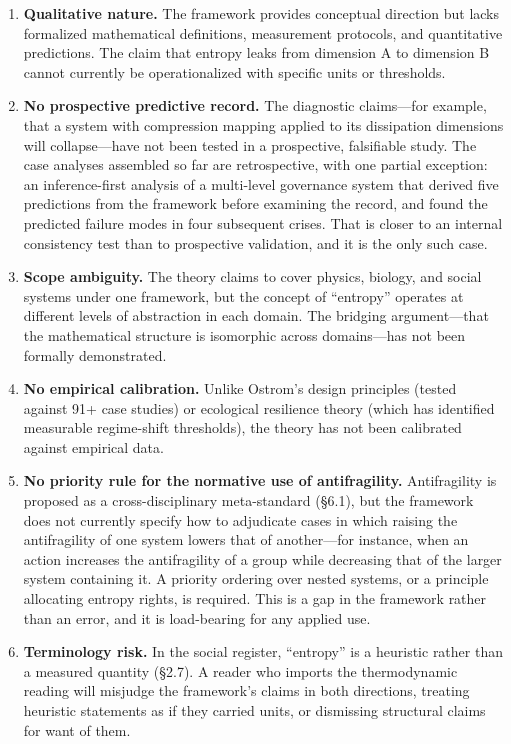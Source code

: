 \documentclass[11pt,a4paper]{article}
\begin{document}
\begin{enumerate}
    \item \textbf{Qualitative nature.} The framework provides conceptual direction but lacks formalized mathematical definitions, measurement protocols, and quantitative predictions. The claim that entropy leaks from dimension A to dimension B cannot currently be operationalized with specific units or thresholds.

    \item \textbf{No prospective predictive record.} The diagnostic claims---for example, that a system with compression mapping applied to its dissipation dimensions will collapse---have not been tested in a prospective, falsifiable study. The case analyses assembled so far are retrospective, with one partial exception: an inference-first analysis of a multi-level governance system that derived five predictions from the framework before examining the record, and found the predicted failure modes in four subsequent crises. That is closer to an internal consistency test than to prospective validation, and it is the only such case.

    \item \textbf{Scope ambiguity.} The theory claims to cover physics, biology, and social systems under one framework, but the concept of ``entropy'' operates at different levels of abstraction in each domain. The bridging argument---that the mathematical structure is isomorphic across domains---has not been formally demonstrated.

    \item \textbf{No empirical calibration.} Unlike Ostrom's design principles (tested against 91+ case studies) or ecological resilience theory (which has identified measurable regime-shift thresholds), the theory has not been calibrated against empirical data.

    \item \textbf{No priority rule for the normative use of antifragility.} Antifragility is proposed as a cross-disciplinary meta-standard (\S6.1), but the framework does not currently specify how to adjudicate cases in which raising the antifragility of one system lowers that of another---for instance, when an action increases the antifragility of a group while decreasing that of the larger system containing it. A priority ordering over nested systems, or a principle allocating entropy rights, is required. This is a gap in the framework rather than an error, and it is load-bearing for any applied use.

    \item \textbf{Terminology risk.} In the social register, ``entropy'' is a heuristic rather than a measured quantity (\S2.7). A reader who imports the thermodynamic reading will misjudge the framework's claims in both directions, treating heuristic statements as if they carried units, or dismissing structural claims for want of them.
\end{enumerate}
\end{document}
